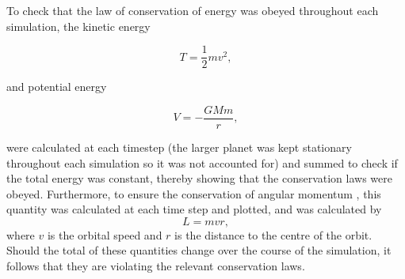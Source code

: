 \documentclass[11pt, english]{report}
\begin{document}
\normalsize{
\noindent To check that the law of conservation of energy \cite{noauthor_feynman_nodate} was obeyed throughout each simulation, the kinetic energy \cite{noauthor_210_2018}

\begin{equation}
    T = \frac{1}{2} m v^2,
\end{equation}
}
\noindent and potential energy \cite{noauthor_gravitational_nodate}

\begin{equation}
    V = -\frac{GMm}{r},
\end{equation}

\noindent were calculated at each timestep (the larger planet was kept stationary throughout each simulation so it was not accounted for) and summed to check if the total energy was constant, thereby showing that the conservation laws were obeyed. Furthermore, to ensure the conservation of angular momentum \cite{noauthor_angular_nodate}, this quantity was calculated at each time step and plotted, and was calculated by 
\begin{equation}
    L = mvr,
\end{equation} where $v$ is the orbital speed and $r$ is the distance to the centre of the orbit. Should the total of these quantities change over the course of the simulation, it follows that they are violating the relevant conservation laws.
\end{document}
